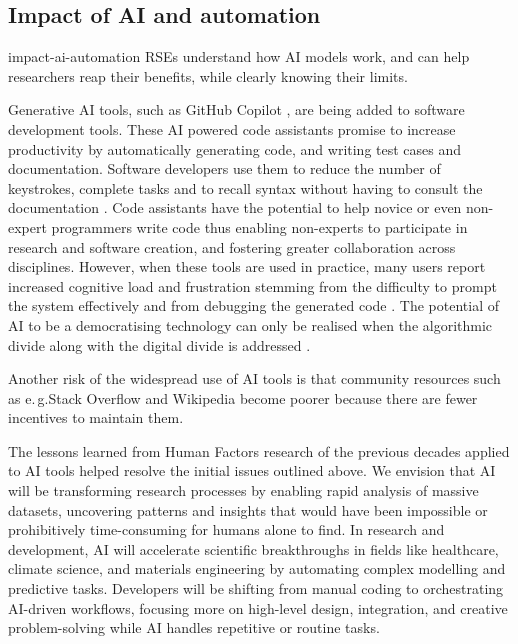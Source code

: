 \documentclass{eceasst}
\newcommand{\eg}{e.\,g.}
\begin{document}
\subsection{Impact of AI and automation}
\label{sec:ai}
\begin{whatis}{}{impact-ai-automation}
RSEs understand how AI models work, and can help researchers reap their benefits, while
clearly knowing their limits.
\end{whatis}
Generative AI tools, such as GitHub Copilot \cite{Friedmann2021}, are being added to software development tools.
These AI powered code assistants promise to increase productivity by automatically generating code, and writing test cases and documentation.
Software developers use them to reduce the number of keystrokes, complete tasks and to recall syntax without having to consult the documentation \cite{Liang2024}.
Code assistants have the potential to help novice or even non-expert programmers write code \cite{Feldman2024} thus enabling non-experts to participate in research and software creation, and fostering greater collaboration across disciplines.
However, when these tools are used in practice, many users report increased cognitive load and frustration stemming from the difficulty to prompt the system effectively and from debugging the generated code \cite{Simkute2025}.
The potential of AI to be a democratising technology can only be realised when the algorithmic divide along with the digital divide is addressed \cite{Yu2020}.

Another risk of the widespread use of AI tools is that community resources such as \eg Stack Overflow and Wikipedia become poorer because there are fewer incentives to maintain them.

The lessons learned from Human Factors research of the previous decades \cite{Simkute2025} applied to AI tools helped resolve the initial issues outlined above.
We envision that AI will be transforming research processes by enabling rapid analysis of massive datasets, uncovering patterns and insights that would have been impossible or prohibitively time-consuming for humans alone to find.
In research and development, AI will accelerate scientific breakthroughs in fields like healthcare, climate science, and materials engineering by automating complex modelling and predictive tasks.
Developers will be shifting from manual coding to orchestrating AI-driven workflows, focusing more on high-level design, integration, and creative problem-solving while AI handles repetitive or routine tasks.
\end{document}
